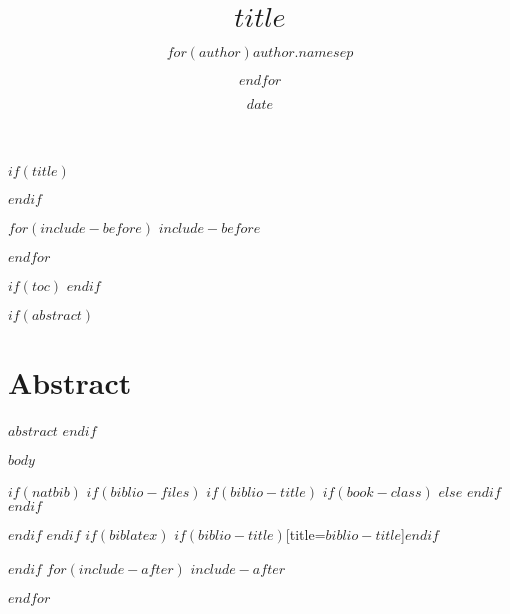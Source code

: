 \documentclass[11pt]{article}
\title{$title$}
\author{$for(author)$$author.name$$sep$ \and $endfor$}
\date{$date$}
\begin{document}
$if(title)$
\maketitle
$endif$

$for(include-before)$
$include-before$

$endfor$

$if(toc)$
\tableofcontents
$endif$

$if(abstract)$
\section{Abstract}
$abstract$
$endif$

$body$

$if(natbib)$
$if(biblio-files)$
$if(biblio-title)$
$if(book-class)$
\renewcommand\bibname{$biblio-title$}
$else$
\renewcommand\refname{$biblio-title$}
$endif$
$endif$


$endif$
$endif$
$if(biblatex)$
\printbibliography$if(biblio-title)$[title=$biblio-title$]$endif$

$endif$
$for(include-after)$
$include-after$

$endfor$
\end{document}
